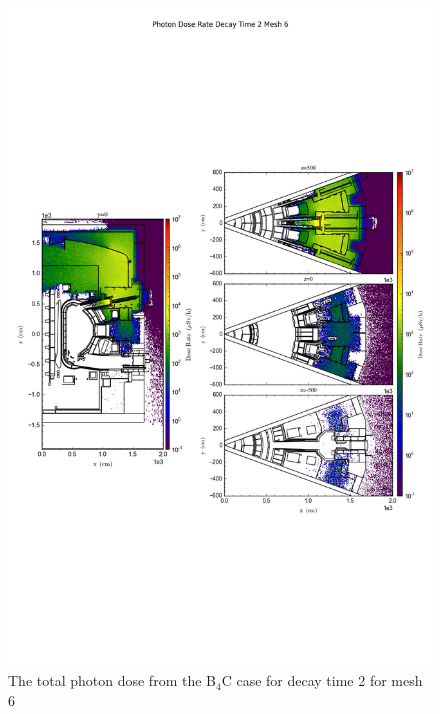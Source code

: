 \documentclass[12pt]{article}
\begin{document}
\begin{figure}[ht!]
\centering
\includegraphics[trim={0cm 9cm 0cm 10cm},clip,scale=0.75]{../plots/final_model/Photon_Dose_Rate_Decay_Time_2_Mesh_6.png}
\caption{The total photon dose from the B$_4$C case for decay time 2 for mesh 6}
\label{fig:ct_photons_dc2_no4bc_m6_flux}
\end{figure}
\newpage
\clearpage
\end{document}
